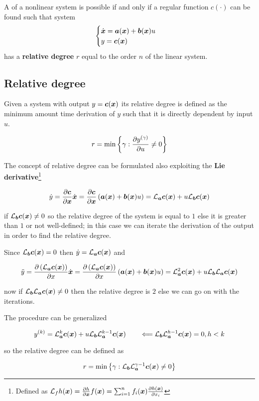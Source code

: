 \begin{theorem}
    A  of a nonlinear system is possible if and only if a regular function $c(\cdot)$ can be found such that system
    \[
        \begin{cases}
            \dot{\boldsymbol{x}} = \boldsymbol{a}(\boldsymbol{x}) + \boldsymbol{b}(\boldsymbol{x}) u \\
            y = \boldsymbol{c}(\boldsymbol{x})
        \end{cases}
    \]
    has a \textbf{relative degree} $r$ equal to the order $n$ of the linear system.
\end{theorem}

\subsection{Relative degree}

Given a system with output $y=\boldsymbol{c}(\boldsymbol{x})$ its relative degree is defined as the minimum amount time derivation of $y$ such that it is directly dependent by input $u$.

\[
    r = \min \left\{ \gamma : \frac{\partial y^{(\gamma)}}{\partial u} \neq 0 \right\}
\]

The concept of relative degree can be formulated also exploiting the \textbf{Lie derivative}\footnote{Defined as $\mathcal{L}_f h(\boldsymbol{x}) = \frac{\partial h}{\partial \boldsymbol{x}} f(\boldsymbol{x}) = \sum_{i=1}^{n} f_i(\boldsymbol{x}) \frac{\partial h(\boldsymbol{x})}{\partial x_i}$}

\[
    \dot y =
    \frac{\partial \boldsymbol{c}}{\partial \boldsymbol{x}} \dot{\boldsymbol{x}} =
    \frac{\partial \boldsymbol{c}}{\partial \boldsymbol{x}} \left(\boldsymbol{a}(\boldsymbol{x}) + \boldsymbol{b}(\boldsymbol{x}) u\right) =
    \mathcal{L}_{\boldsymbol{a}} \boldsymbol{c}(\boldsymbol{x}) + u \mathcal{L}_{\boldsymbol{b}} \boldsymbol{c}(\boldsymbol{x})
\]

if $\mathcal{L}_{\boldsymbol{b}} \boldsymbol{c}(\boldsymbol{x}) \neq 0$ so the relative degree of the system is equal to $1$ else it is greater than $1$ or not well-defined;
in this case we can iterate the derivation of the output in order to find the relative degree.

Since $\mathcal{L}_{\boldsymbol{b}} \boldsymbol{c}(\boldsymbol{x}) = 0$ then $\dot y = \mathcal{L}_{\boldsymbol{a}} \boldsymbol{c}(\boldsymbol{x})$ and

\[
    \ddot y =
    \frac{\partial \left( \mathcal{L}_{\boldsymbol{a}} \boldsymbol{c}(\boldsymbol{x}) \right)}{\partial x} \dot{\boldsymbol{x}} =
    \frac{\partial \left( \mathcal{L}_{\boldsymbol{a}} \boldsymbol{c}(\boldsymbol{x}) \right)}{\partial x} \left(\boldsymbol{a}(\boldsymbol{x}) + \boldsymbol{b}(\boldsymbol{x}) u\right) =
    \mathcal{L}_{\boldsymbol{a}}^2 \boldsymbol{c}(\boldsymbol{x}) + u \mathcal{L}_{\boldsymbol{b}} \mathcal{L}_{\boldsymbol{a}} \boldsymbol{c}(\boldsymbol{x})
\]

now if $\mathcal{L}_{\boldsymbol{b}} \mathcal{L}_{\boldsymbol{a}} \boldsymbol{c}(\boldsymbol{x}) \neq 0$ then the relative degree is $2$ else we can go on with the iterations.

The procedure can be generalized

\[
    y^{(k)} = \mathcal{L}_{\boldsymbol{a}}^k \boldsymbol{c}(\boldsymbol{x}) + u \mathcal{L}_{\boldsymbol{b}} \mathcal{L}_{\boldsymbol{a}}^{k-1} \boldsymbol{c}(\boldsymbol{x}) \qquad \Longleftarrow \mathcal{L}_{\boldsymbol{b}} \mathcal{L}_{\boldsymbol{a}}^{h-1} \boldsymbol{c}(\boldsymbol{x}) = 0, h < k
\]

so the relative degree can be defined as

\[
    r = \min \left\{ \gamma : \mathcal{L}_{\boldsymbol{b}} \mathcal{L}_{\boldsymbol{a}}^{\gamma-1} \boldsymbol{c}(\boldsymbol{x}) \neq 0 \right\}
\]
